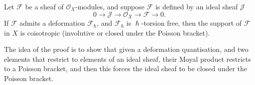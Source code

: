     \begin{thm} \label{thm:torsionfree}   Let \( \mathcal{F}\) be a sheaf of \(\mathcal{O}_X \)-modules, and suppose \( \mathcal{F}\) is defined by an ideal sheaf \( \mathcal{J} \)
    \[ 0 \rightarrow \mathcal{J} \rightarrow \mathcal{O}_X \rightarrow \mathcal{F} \rightarrow 0. \]
    If \( \mathcal{F}\) admits a deformation \( \mathcal{F}_{\hslash}\), and \( \mathcal{F}_{\hslash}\) is \(\hslash\)-torsion free, then the support of \( \mathcal{F}\) in \(X\) is coisotropic (involutive or closed under the Poisson bracket).
    \end{thm}

    The idea of the proof is to show that given a deformation quantisation, and two elements that restrict to elements of an ideal sheaf, their Moyal product restricts to a Poisson bracket, and then this forces the ideal sheaf to be closed under the Poisson bracket.

